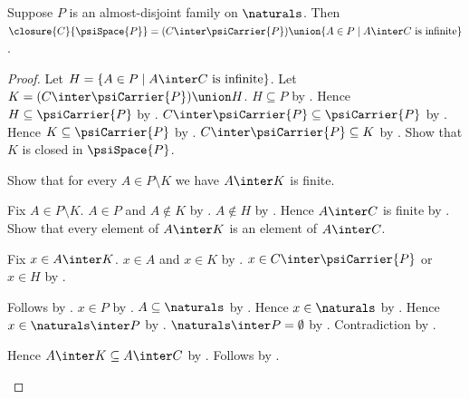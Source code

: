 \begin{theorem}\label{psi_closure_formula}
    Suppose $P$ is an almost-disjoint family on $\naturals$.
    Then
        $\closure{C}{\psiSpace{P}}=
        (C\inter\psiCarrier{P})\union
        \{A\in P\mid \text{$A\inter C$ is infinite}\}$.
\end{theorem}
\begin{proof}
    Let $H=\{A\in P\mid \text{$A\inter C$ is infinite}\}$.
    Let $K=(C\inter\psiCarrier{P})\union H$.
    $H\subseteq P$ by .
    Hence $H\subseteq\psiCarrier{P}$ by
        .
    $C\inter\psiCarrier{P}\subseteq\psiCarrier{P}$
        by .
    Hence $K\subseteq\psiCarrier{P}$
        by .
    $C\inter\psiCarrier{P}\subseteq K$ by .
    Show that $K$ is closed in $\psiSpace{P}$.
    \begin{subproof}
        Show that for every $A\in P\setminus K$ we have
            $A\inter K$ is finite.
        \begin{subproof}
            Fix $A\in P\setminus K$.
            $A\in P$ and $A\notin K$ by .
            $A\notin H$ by .
            Hence $A\inter C$ is finite by \auto.
            Show that every element of $A\inter K$ is an element of
                $A\inter C$.
            \begin{subproof}
                Fix $x\in A\inter K$.
                $x\in A$ and $x\in K$ by .
                $x\in C\inter\psiCarrier{P}$ or $x\in H$
                    by .
                \begin{byCase}
                        Follows by .
                        $x\in P$ by .
                        $A\subseteq\naturals$ by
                            .
                        Hence $x\in\naturals$ by .
                        Hence $x\in\naturals\inter P$ by .
                        $\naturals\inter P=\emptyset$ by
                            .
                        Contradiction by .
                \end{byCase}
            \end{subproof}
            Hence $A\inter K\subseteq A\inter C$ by .
            Follows by .

\end{subproof}
\end{subproof}
\end{proof}
